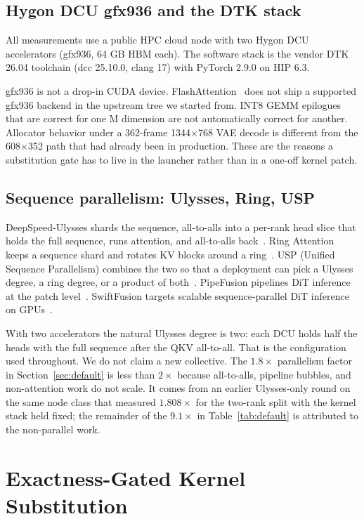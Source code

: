 \documentclass[11pt]{article}
\begin{document}
\subsection{Hygon DCU gfx936 and the DTK stack}
\label{sec:dcu}

All measurements use a public HPC cloud node with two Hygon DCU accelerators (gfx936, 64 GB HBM each). The software stack is the vendor DTK 26.04 toolchain (dcc 25.10.0, clang 17) with PyTorch 2.9.0 on HIP 6.3.

gfx936 is not a drop-in CUDA device. FlashAttention~\cite{4,5} does not ship a supported gfx936 backend in the upstream tree we started from. INT8 GEMM epilogues that are correct for one M dimension are not automatically correct for another. Allocator behavior under a 362-frame 1344$\times$768 VAE decode is different from the 608$\times$352 path that had already been in production. These are the reasons a substitution gate has to live in the launcher rather than in a one-off kernel patch.

\subsection{Sequence parallelism: Ulysses, Ring, USP}
\label{sec:sp}

DeepSpeed-Ulysses shards the sequence, all-to-alls into a per-rank head slice that holds the full sequence, runs attention, and all-to-alls back~\cite{6}. Ring Attention keeps a sequence shard and rotates KV blocks around a ring~\cite{7}. USP (Unified Sequence Parallelism) combines the two so that a deployment can pick a Ulysses degree, a ring degree, or a product of both~\cite{1}. PipeFusion pipelines DiT inference at the patch level~\cite{2}. SwiftFusion targets scalable sequence-parallel DiT inference on GPUs~\cite{3}.

With two accelerators the natural Ulysses degree is two: each DCU holds half the heads with the full sequence after the QKV all-to-all. That is the configuration used throughout. We do not claim a new collective. The $1.8\times$ parallelism factor in Section~\ref{sec:default} is less than $2\times$ because all-to-alls, pipeline bubbles, and non-attention work do not scale. It comes from an earlier Ulysses-only round on the same node class that measured $1.808\times$ for the two-rank split with the kernel stack held fixed; the remainder of the $9.1\times$ in Table~\ref{tab:default} is attributed to the non-parallel work.

\section{Exactness-Gated Kernel Substitution}
\label{sec:method}
\end{document}
